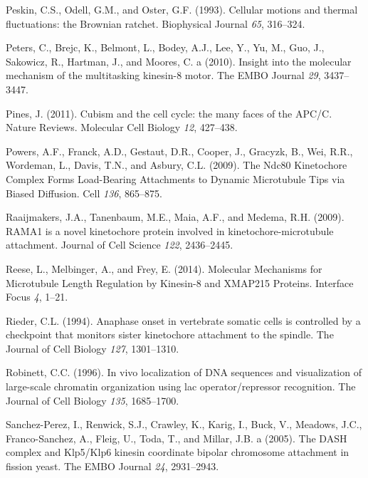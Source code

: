 \documentclass[12pt,a4paper,twoside,openright]{book}
\begin{document}
Peskin, C.S., Odell, G.M., and Oster, G.F. (1993). Cellular motions and
thermal fluctuations: the Brownian ratchet. Biophysical Journal
\emph{65}, 316--324.

Peters, C., Brejc, K., Belmont, L., Bodey, A.J., Lee, Y., Yu, M., Guo,
J., Sakowicz, R., Hartman, J., and Moores, C. a (2010). Insight into the
molecular mechanism of the multitasking kinesin-8 motor. The EMBO
Journal \emph{29}, 3437--3447.

Pines, J. (2011). Cubism and the cell cycle: the many faces of the
APC/C. Nature Reviews. Molecular Cell Biology \emph{12}, 427--438.

Powers, A.F., Franck, A.D., Gestaut, D.R., Cooper, J., Gracyzk, B., Wei,
R.R., Wordeman, L., Davis, T.N., and Asbury, C.L. (2009). The Ndc80
Kinetochore Complex Forms Load-Bearing Attachments to Dynamic
Microtubule Tips via Biased Diffusion. Cell \emph{136}, 865--875.

Raaijmakers, J.A., Tanenbaum, M.E., Maia, A.F., and Medema, R.H. (2009).
RAMA1 is a novel kinetochore protein involved in kinetochore-microtubule
attachment. Journal of Cell Science \emph{122}, 2436--2445.

Reese, L., Melbinger, A., and Frey, E. (2014). Molecular Mechanisms for
Microtubule Length Regulation by Kinesin-8 and XMAP215 Proteins.
Interface Focus \emph{4}, 1--21.

Rieder, C.L. (1994). Anaphase onset in vertebrate somatic cells is
controlled by a checkpoint that monitors sister kinetochore attachment
to the spindle. The Journal of Cell Biology \emph{127}, 1301--1310.

Robinett, C.C. (1996). In vivo localization of DNA sequences and
visualization of large-scale chromatin organization using lac
operator/repressor recognition. The Journal of Cell Biology \emph{135},
1685--1700.

Sanchez-Perez, I., Renwick, S.J., Crawley, K., Karig, I., Buck, V.,
Meadows, J.C., Franco-Sanchez, A., Fleig, U., Toda, T., and Millar, J.B.
a (2005). The DASH complex and Klp5/Klp6 kinesin coordinate bipolar
chromosome attachment in fission yeast. The EMBO Journal \emph{24},
2931--2943.
\end{document}
